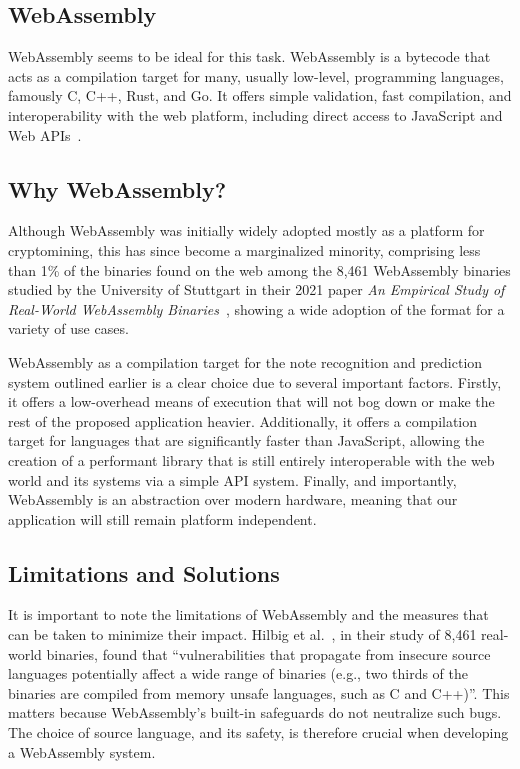 \subsection{WebAssembly}

WebAssembly seems to be ideal for this task. WebAssembly is a bytecode that
acts as a compilation target for many, usually low-level, programming
languages, famously C, C++, Rust, and Go. It offers simple validation, fast
compilation, and interoperability with the web platform, including direct
access to JavaScript and Web APIs~\cite{haas2017bringing}.

\subsection{Why WebAssembly?}
\label{sec:why-webassembly}

Although WebAssembly was initially widely adopted mostly as a platform for
cryptomining, this has since become a marginalized minority, comprising less
than 1\% of the binaries found on the web among the 8,461 WebAssembly
binaries studied by the University of Stuttgart in their 2021 paper
\textit{An Empirical Study of Real-World WebAssembly
Binaries}~\cite{hilbig2021empirical}, showing a wide adoption of the format
for a variety of use cases.

WebAssembly as a compilation target for the note recognition and prediction
system outlined earlier is a clear choice due to several important factors.
Firstly, it offers a low-overhead means of execution that will not bog down
or make the rest of the proposed application heavier. Additionally, it offers
a compilation target for languages that are significantly faster than
JavaScript, allowing the creation of a performant library that is still
entirely interoperable with the web world and its systems via a simple API
system. Finally, and importantly, WebAssembly is an abstraction over modern
hardware, meaning that our application will still remain platform
independent.

\subsection{Limitations and Solutions}

It is important to note the limitations of WebAssembly and the measures that
can be taken to minimize their impact. Hilbig et
al.~\cite{hilbig2021empirical}, in their study of 8,461 real-world binaries,
found that ``vulnerabilities that propagate from insecure source languages
potentially affect a wide range of binaries (e.g., two thirds of the binaries
are compiled from memory unsafe languages, such as C and C++)''. This matters
because WebAssembly's built-in safeguards do not neutralize such bugs. The
choice of source language, and its safety, is therefore crucial when
developing a WebAssembly system.

